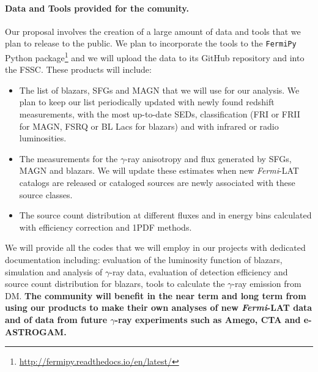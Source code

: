 \documentclass[12 pt]{article}
\newcommand{\FIXME}[1]{{\color{red}{\em Comment: }{#1}}}
\begin{document}
\paragraph{Data and Tools provided for the comunity.}
Our proposal involves the creation of a large amount of data and tools that we plan to release to the public. We plan to incorporate the tools to the {\tt FermiPy} Python package\footnote{\url{http://fermipy.readthedocs.io/en/latest/}} and we will upload the data to its GitHub repository and into the FSSC.
These products will include:
\begin{itemize}
\vspace{-0.4cm}
\item The list of blazars, SFGs and MAGN that we will use for our analysis.
We plan to keep our list periodically updated with newly found redshift measurements, with the most up-to-date SEDs, classification (FRI or FRII for MAGN, FSRQ or BL Lacs for blazars) and with infrared or radio luminosities.
\vspace{-0.4cm}
\item The measurements for the $\gamma$-ray anisotropy and flux generated by SFGs, MAGN and blazars. We will update these estimates when new {\it Fermi}-LAT catalogs are released or cataloged sources are newly associated with these source classes.
\vspace{-0.4cm}
\item The source count distribution at different fluxes and in energy bins calculated with efficiency correction and 1PDF methods.
\vspace{-0.4cm}
\end{itemize}
We will provide all the codes that we will employ in our projects with dedicated documentation including: evaluation of the luminosity function of blazars, simulation and analysis of $\gamma$-ray data, evaluation of detection efficiency and source count distribution for blazars, tools to calculate the $\gamma$-ray emission from DM.
{\bf The community will benefit in the near term and long term from using our products to make their own analyses of new {\it Fermi}-LAT data and of data from future $\gamma$-ray experiments such as Amego, CTA and e-ASTROGAM.}

\vspace{-0.5cm}
\end{document}
